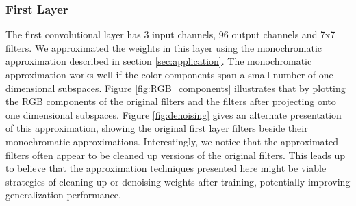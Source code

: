 
\subsubsection{First Layer}

The first convolutional layer has 3 input channels, 96
output channels and 7x7 filters.  We approximated the weights in this
layer using the monochromatic approximation described in section
\ref{sec:application}. The monochromatic approximation works well if
the color components span a small number of one dimensional
subspaces. Figure \ref{fig:RGB_components} illustrates that by plotting the RGB components of the original filters and the filters after
projecting onto one dimensional subspaces. Figure \ref{fig:denoising} gives an alternate
presentation of this approximation, showing the original first layer
filters beside their monochromatic approximations.  Interestingly, we
notice that the approximated filters often appear to be cleaned up
versions of the original filters. This leads up to believe that the
approximation techniques presented here might be viable strategies of
cleaning up or denoising weights after training, potentially improving generalization performance.


